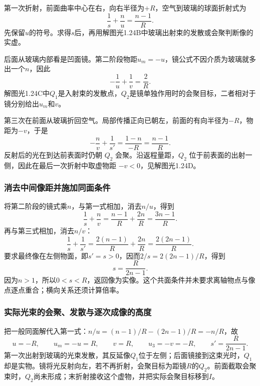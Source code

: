 \documentclass[UTF8,fontset=fandol,a4paper,11pt]{ctexart}
\begin{document}
第一次折射，前面曲率中心在右，向右半径为$+R$，空气到玻璃的球面折射式为
\[
\frac1s+\frac n u=\frac{n-1}R.
\]
先保留$u$的符号。求得$s$后，再用解图光1.24B中玻璃出射束的发散或会聚判断像的实虚。

后面从玻璃内部看是凹面镜。第二阶段物距$u_m=-u$，镜公式不因介质为玻璃就多出一个$n$，因此
\[
-\frac1u+\frac1v=\frac2R.
\]
解图光1.24C中$Q_1$是入射束的发散点，$Q_2$是镜单独作用时的会聚目标，二者相对于镜分别给出$u_m$和$v$。

第三次在前面从玻璃折回空气。局部传播正向已朝左，前面的有向半径为$-R$，物距为$-v$，于是
\[
-\frac n v+\frac1{s'}
=\frac{1-n}{-R}=\frac{n-1}R.
\]
反射后的光在到达前表面时仍朝 $Q_2$ 会聚。沿返程量距，$Q_2$ 位于前表面的出射一侧，因此在最后一次折射中取虚物距 $-v<0$，见解图光1.24D。

\subsubsection*{消去中间像距并施加同面条件}
将第二阶段的镜式乘$n$，与第一式相加，消去$n/u$，得到
\[
\frac1s+\frac n v=\frac{n-1}R+\frac{2n}R
=\frac{3n-1}R.
\]
再与第三式相加，消去$n/v$：
\[
\frac1s+\frac1{s'}
=\frac{2(n-1)}R+\frac{2n}R
=\frac{2(2n-1)}R.
\]
要求最终像在左侧物面，即$s'=s>0$，因而$2/s=2(2n-1)/R$，得到
\[
\boxed{s=\frac R{2n-1}}.
\]
因为$n>1$，所以$0<s<R$，返回像为实像。这个共面条件并未要求离轴物点与像点逐点重合；横向关系还须计算倍率。

\subsubsection*{实际光束的会聚、发散与逐次成像的高度}
把一般同面解代入第一式：$n/u=(n-1)/R-(2n-1)/R=-n/R$，故
\[
u=-R,\qquad u_m=-u=R,\qquad v=R,
\qquad u_3=-v=-R,\qquad s'=\frac{R}{2n-1}.
\]
第一次出射到玻璃的光束发散，其反延像$Q_1$位于左侧；后面镜接到这束光时，$Q_1$却是实物。镜将光反射向左，若不再折射，会聚目标为距镜$R$的$Q_2$。前面截取会聚束时，$Q_2$尚未形成；末折射接收这个虚物，并把实际会聚目标移到$I$。
\end{document}
